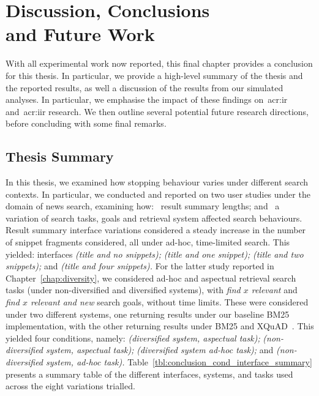 
\chapter[Discussion, Conclusions and Future Work]{Discussion, Conclusions\\and Future Work}\label{chap:conclusions}
With all experimental work now reported, this final chapter provides a conclusion for this thesis. In particular, we provide a high-level summary of the thesis and the reported results, as well a discussion of the results from our simulated analyses. In particular, we emphasise the impact of these findings on~\gls{acr:ir} and~\gls{acr:iir} research. We then outline several potential future research directions, before concluding with some final remarks.

\section{Thesis Summary}\label{sec:conclusions:summary}
In this thesis, we examined how stopping behaviour varies under different search contexts. In particular, we conducted and reported on two user studies under the domain of news search, examining how:~ result summary lengths; and~ a variation of search tasks, goals and retrieval system affected search behaviours. Result summary interface variations considered a steady increase in the number of snippet fragments considered, all under ad-hoc, time-limited search. This yielded: interfaces  \emph{(title and no snippets);}  \emph{(title and one snippet);}  \emph{(title and two snippets);} and  \emph{(title and four snippets).} For the latter study reported in Chapter~\ref{chap:diversity}, we considered ad-hoc and aspectual retrieval search tasks (under non-diversified and diversified systems), with \emph{find $x$ relevant} and \emph{find $x$ relevant and new} search goals, without time limits. These were considered under two different systems, one returning results under our baseline BM25 implementation, with the other returning results under BM25 and XQuAD~\citep{santos2010query_reformulations_diversification}. This yielded four conditions, namely:  \emph{(diversified system, aspectual task);}  \emph{(non-diversified system, aspectual task);}  \emph{(diversified system ad-hoc task);} and  \emph{(non-diversified system, ad-hoc task).} Table~\ref{tbl:conclusion_cond_interface_summary} presents a summary table of the different interfaces, systems, and tasks used across the eight variations trialled.

